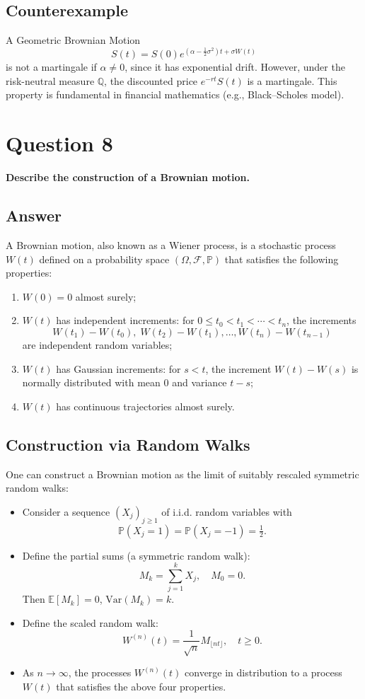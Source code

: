 \documentclass[12pt,a4paper]{book}
\theoremstyle{remark}
\newcommand{\PP}{\mathbb{P}}          %
\newcommand{\EE}{\mathbb{E}}          %
\newcommand{\QQ}{\mathbb{Q}}          %
\newcommand{\F}{\mathcal{F}}          %
\newcommand{\Var}{\mathrm{Var}}       %
\begin{document}
\subsection*{Counterexample}
A Geometric Brownian Motion 
\[
S(t) = S(0) e^{(\alpha - \tfrac{1}{2}\sigma^2)t + \sigma W(t)}
\]
is not a martingale if $\alpha \neq 0$, since it has exponential drift. However, under the risk-neutral measure $\QQ$, the discounted price $e^{-rt}S(t)$ is a martingale. This property is fundamental in financial mathematics (e.g., Black--Scholes model).


\newpage
\section{Question 8}
\textbf{Describe the construction of a Brownian motion.}

\subsection*{Answer}
A Brownian motion, also known as a Wiener process, is a stochastic process $W(t)$ defined on a probability space $(\Omega, \F, \PP)$ that satisfies the following properties:

\begin{enumerate}[label=\roman*)]
    \item $W(0) = 0$ almost surely;
    \item $W(t)$ has independent increments: for $0 \leq t_0 < t_1 < \cdots < t_n$, the increments 
    \[
        W(t_1) - W(t_0), \; W(t_2) - W(t_1), \ldots, W(t_n) - W(t_{n-1})
    \]
    are independent random variables;
    \item $W(t)$ has Gaussian increments: for $s < t$, the increment $W(t) - W(s)$ is normally distributed with mean $0$ and variance $t-s$;
    \item $W(t)$ has continuous trajectories almost surely.
\end{enumerate}

\subsection*{Construction via Random Walks}
One can construct a Brownian motion as the limit of suitably rescaled symmetric random walks:

\begin{itemize}
    \item Consider a sequence $(X_j)_{j\geq 1}$ of i.i.d. random variables with
    \[
        \PP(X_j = 1) = \PP(X_j = -1) = \tfrac{1}{2}.
    \]
    \item Define the partial sums (a symmetric random walk):
    \[
        M_k = \sum_{j=1}^k X_j, \quad M_0 = 0.
    \]
    Then $\EE[M_k] = 0$, $\Var(M_k) = k$.
    \item Define the scaled random walk:
    \[
        W^{(n)}(t) = \frac{1}{\sqrt{n}} M_{\lfloor nt \rfloor}, \quad t \geq 0.
    \]
    \item As $n \to \infty$, the processes $W^{(n)}(t)$ converge in distribution to a process $W(t)$ that satisfies the above four properties.
\end{itemize}
\end{document}
